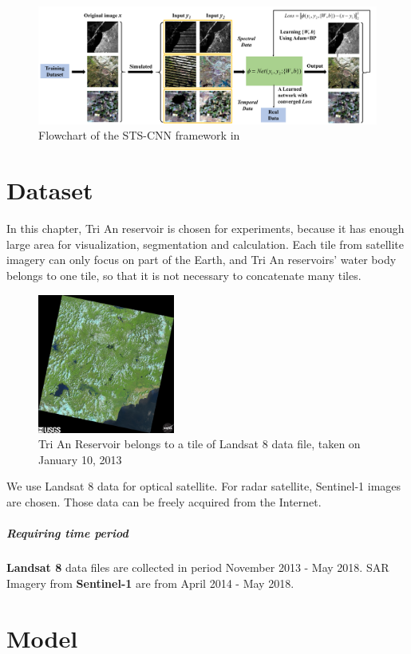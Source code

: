 \begin{figure}[]
	\includegraphics[width=1\textwidth]{figures/sts-cnn_framework.png}
	\caption{Flowchart of the STS-CNN framework in \cite{Zhang2018}}
\end{figure}

\section {Dataset}
In this chapter, Tri An reservoir is chosen for experiments, because it has enough large area for visualization, segmentation and calculation. Each tile from satellite imagery can only focus on part of the Earth, and Tri An reservoirs' water body belongs to one tile, so that it is not necessary to concatenate many tiles.

\begin{figure}[]
	\centering
	\includegraphics[width=0.4\textwidth]{figures/l8tile.png}
	\caption{Tri An Reservoir belongs to a tile of Landsat 8 data file, taken on January 10, 2013}
\end{figure}	


We use Landsat 8 data for optical satellite. For radar satellite, Sentinel-1 images are chosen. Those data can be freely acquired from the Internet.

\subparagraph{Requiring time period} \textbf{Landsat 8} data files are collected in period November 2013 - May 2018. SAR Imagery from \textbf{Sentinel-1} are from April 2014 - May 2018.

\section{Model}

